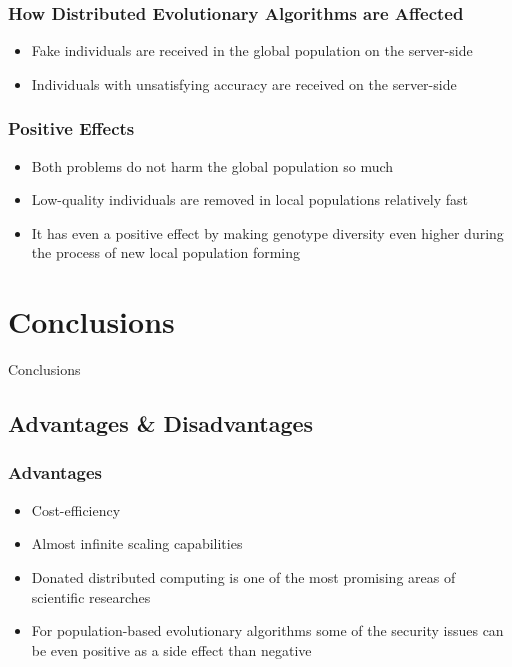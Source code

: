 \documentclass{beamer}
\begin{document}
\begin{frame}
\frametitle{How Distributed Evolutionary Algorithms are Affected}
\begin{itemize}
	\item Fake individuals are received in the global population on the server-side
	\item Individuals with unsatisfying accuracy are received on the server-side
\end{itemize}
\end{frame}

\begin{frame}
\frametitle{Positive Effects}
\begin{itemize}
	\item Both problems do not harm the global population so much
	\item Low-quality individuals are removed in local populations relatively fast
	\item It has even a positive effect by making genotype diversity even higher during the process of new local population forming
\end{itemize}
\end{frame}

\section{Conclusions}

\begin{frame}
\center \huge{Conclusions}
\end{frame}

\subsection{Advantages \& Disadvantages}

\begin{frame}
\frametitle{Advantages}
\begin{itemize}
	\item Cost-efficiency
	\item Almost infinite scaling capabilities
	\item Donated distributed computing is one of the most promising areas of scientific researches
	\item For population-based evolutionary algorithms some of the security issues can be even positive as a side effect than negative
\end{itemize}
\end{frame}
\end{document}

